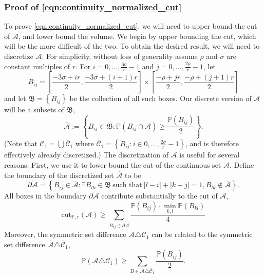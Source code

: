 \documentclass[11pt,twoside]{article}
\newcommand{\set}[1]{\left\{#1\right\}}
\newcommand{\cut}{\mathrm{cut}}
\newcommand{\abs}[1]{\left \lvert #1 \right \rvert}
\newcommand{\1}{\mathbf{1}}
\newcommand{\Pbb}{\mathbb{P}}
\newcommand{\Cset}{\mathcal{C}}
\newcommand{\Aset}{\mathcal{A}}
\begin{document}
\subsubsection{Proof of \eqref{eqn:continuity_normalized_cut}}
To prove \eqref{eqn:continuity_normalized_cut}, we will need to upper bound the cut of $\Aset$, and lower bound the volume. We begin by upper bounding the cut, which will be the more difficult of the two. To obtain the desired result, we will need to discretize $\Aset$. For simplicity, without loss of generality assume $\rho$ and $\sigma$ are constant multiples of $r$. For $i = 0,\ldots,\frac{6\sigma}{r} - 1$ and $j = 0,\ldots, \frac{2\rho}{r} - 1$, let
\begin{equation*}
B_{ij} = \left[\frac{-3\sigma + ir}{2}, \frac{-3\sigma + (i + 1)r}{2}\right] \times \left[\frac{-\rho + jr}{2}, \frac{-\rho + (j + 1)r}{2}\right] 
\end{equation*}
and let $\mathfrak{B} = \set{B_{ij}}$ be the collection of all such boxes. Our discrete version of $\mathcal{A}$ will be a subsets of $\mathfrak{B}$,
\begin{equation*}
\overline{\mathcal{A}} := \set{B_{ij} \in \mathfrak{B}: \Pbb(B_{ij} \cap \mathcal{A}) \geq \frac{\Pbb(B_{ij})}{2}}.
\end{equation*}
(Note that $\mathcal{C}_1 = \bigcup \overline{\Cset}_1$ where $\overline{\Cset}_1 = \set{B_{ij}: i \in 0,\ldots,\frac{2\sigma}{r} - 1 }$, and is therefore effectively already discretized.)
The discretization of $\Aset$ is useful for several reasons. First, we use it to lower bound the cut of the continuous set $\Aset$. Define the boundary of the discretized set $\overline{\mathcal{A}}$ to be 
\begin{equation*}
\overline{\partial \Aset} = \set{B_{ij} \in \overline{\mathcal{A}}: \exists B_{lk} \in \mathfrak{B} ~\textrm{such that}~\abs{l - i} + \abs{k - j} = 1, B_{lk} \not\in \overline{\mathcal{A}}}.
\end{equation*}
All boxes in the boundary $\overline{\partial \Aset}$ contribute substantially to the cut of $\Aset$,
\begin{equation}
\label{eqn:lb_proof}
\cut_{\Pbb,r}(\mathcal{\Aset}) \geq \sum_{B_{ij} \in \overline{\partial\mathcal{A}}} \frac{\Pbb(B_{ij}) \cdot \min_{k,l} \Pbb(B_{kl})}{4}
\end{equation}
Moreover, the symmetric set difference $\Aset \triangle \Cset_1$ can be related to the symmetric set difference $\overline{\Aset} \triangle \overline{\Cset}_1$,
\begin{equation}
\label{eqn:lb_proof_1}
\Pbb(\Aset \triangle \Cset_1) \geq \sum_{B \in \overline{\Aset} \triangle \overline{\Cset}_1} \frac{\Pbb(B_{ij})}{2}.
\end{equation}
\end{document}
